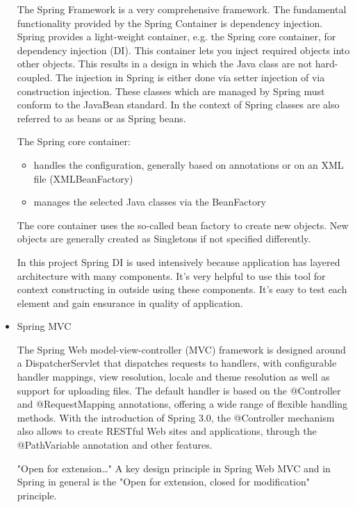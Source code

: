 \documentclass[12pt,a4paper,titlepage]{article}
\begin{document}
\begin{itemize}
The Spring Framework is a very comprehensive framework. The fundamental functionality provided by the Spring Container is dependency injection. Spring provides a light-weight container, e.g. the Spring core container, for dependency injection (DI). This container lets you inject required objects into other objects. This results in a design in which the Java class are not hard-coupled. The injection in Spring is either done via setter injection of via construction injection. These classes which are managed by Spring must conform to the JavaBean standard. In the context of Spring classes are also referred to as beans or as Spring beans.

The Spring core container:

\begin{itemize}
\item handles the configuration, generally based on annotations or on an XML file (XMLBeanFactory)
\item manages the selected Java classes via the BeanFactory
\end{itemize}

The core container uses the so-called bean factory to create new objects. New objects are generally created as Singletons if not specified differently.

In this project Spring DI is used intensively because application has layered architecture with many components. It's very helpful to use this tool for context constructing in outside using these components. It's easy to test each element and gain ensurance in quality of application.



\item Spring MVC

	The Spring Web model-view-controller (MVC) framework is designed around a DispatcherServlet that dispatches requests to handlers, with configurable handler mappings, view resolution, locale and theme resolution as well as support for uploading files. The default handler is based on the @Controller and @RequestMapping annotations, offering a wide range of flexible handling methods. With the introduction of Spring 3.0, the @Controller mechanism also allows to create RESTful Web sites and applications, through the @PathVariable annotation and other features.
	
	"Open for extension…​" A key design principle in Spring Web MVC and in Spring in general is the "Open for extension, closed for modification" principle.


\end{itemize}
\end{document}
